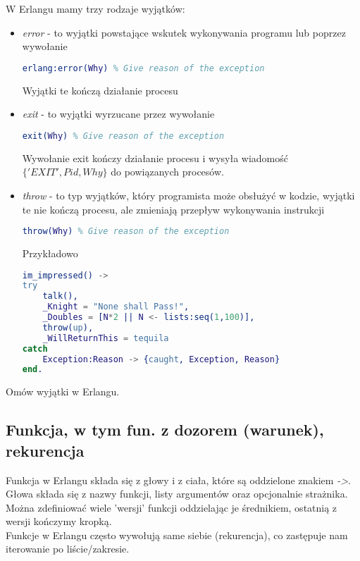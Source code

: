 \documentclass[a4paper,15pt]{article}
\newcommand{\ask}[2]{
    \begin{tcolorbox}[colback=black!5!white,colframe=gray,title={Pytanie #1}]
        #2
    \end{tcolorbox}
}
\begin{document}
W Erlangu mamy trzy rodzaje wyjątków:
\begin{itemize}
\item \textit{error} - to wyjątki powstające wskutek wykonywania programu lub poprzez wywołanie 
\begin{lstlisting}[language=Erlang]
erlang:error(Why) % Give reason of the exception
\end{lstlisting}
Wyjątki te kończą działanie procesu
\item \textit{exit} - to wyjątki wyrzucane przez wywołanie
\begin{lstlisting}[language=Erlang]
exit(Why) % Give reason of the exception
\end{lstlisting}
Wywołanie exit kończy działanie procesu i wysyła wiadomość $\{'EXIT',Pid,Why\}$ do powiązanych procesów.
\item \textit{throw} - to typ wyjątków, który programista może obsłużyć w kodzie, wyjątki te nie kończą procesu, ale zmieniają przepływ wykonywania instrukcji 
\begin{lstlisting}[language=Erlang]
throw(Why) % Give reason of the exception
\end{lstlisting}
Przykładowo
\begin{lstlisting}[language=Erlang]
im_impressed() ->
try 
	talk(),
	_Knight = "None shall Pass!",
	_Doubles = [N*2 || N <- lists:seq(1,100)],
	throw(up),
	_WillReturnThis = tequila
catch
	Exception:Reason -> {caught, Exception, Reason}
end.
\end{lstlisting}
\end{itemize}

\ask{}{
Omów wyjątki w Erlangu.
}


\subsection{Funkcja, w tym fun. z dozorem (warunek), rekurencja}

Funkcja w Erlangu składa się z głowy i z ciała, które są oddzielone znakiem \textit{->}. \\ 

Głowa składa się z nazwy funkcji, listy argumentów oraz opcjonalnie strażnika. Można zdefiniować wiele 'wersji' funkcji oddzielając je średnikiem, ostatnią z wersji kończymy kropką. \\

 
Funkcje w Erlangu często wywołują same siebie (rekurencja), co zastępuje nam iterowanie po liście/zakresie. \\
\end{document}
